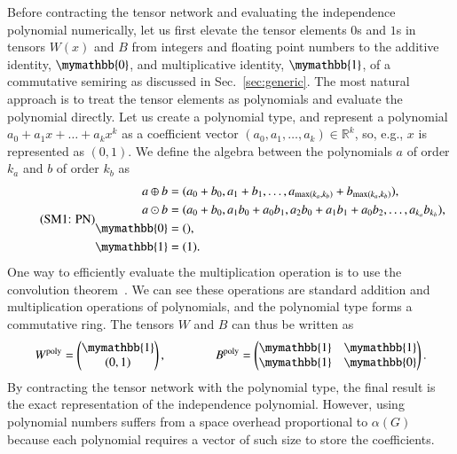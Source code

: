 \documentclass[onefignum, onetabnum]{siamart190516}
\newcommand{\eqname}[1]{\stepcounter{equation}\tag{\theequation : #1}}
\newcommand{\<}{\langle}
\renewcommand{\>}{\rangle}
\begin{document}
Before contracting the tensor network and evaluating the independence polynomial numerically, let us first elevate the tensor elements $0$s and $1$s in tensors $W(x)$ and $B$ from integers and floating point numbers to the additive identity,
$\mymathbb{0}$, and multiplicative identity, $\mymathbb{1}$, of a commutative semiring as discussed in Sec.~\ref{sec:generic}.
The most natural approach is to treat the tensor elements as polynomials and evaluate the polynomial directly.
Let us create a polynomial type, and represent a polynomial $a_0 + a_1 x + \ldots + a_k x^k$ as a coefficient vector $(a_0, a_1, \ldots, a_k) \in \mathbb{R}^k$, so, e.g., $x$ is represented as $(0, 1)$.
We define the algebra between the polynomials $a$ of order $k_a$ and $b$ of order $k_b$ as
\begin{equation}
    \eqname{PN}
    \begin{split}
    a \oplus b &= (a_0 + b_0, a_1 + b_1, \ldots, a_{\max(k_a, k_b)} + b_{\max(k_a, k_b)}),\\
    a \odot b &= (a_0 + b_0, a_1b_0 + a_0b_1, a_{2}b_{0} + a_{1}b_{1} + a_{0}b_{2},  \ldots, a_{k_a} b_{k_b}),\\
    \mymathbb{0} &= (),  \\
    \mymathbb{1} &= (1).\label{eq:polynomial}
    \end{split}
\end{equation}
One way to efficiently evaluate the multiplication operation is to use the convolution theorem~\cite{Schonhage1971}.
We can see these operations are standard addition and multiplication operations of polynomials, and the polynomial type forms a commutative ring. The tensors $W$ and $B$ can thus be written as 
\begin{equation}
    W^{\rm poly} = \left(\begin{matrix}
        \mymathbb{1} \\
        (0,1)
    \end{matrix}\right),   
    \qquad \qquad
        B^{\rm poly} = \left(\begin{matrix}
        \mymathbb{1}  & \mymathbb{1} \\
        \mymathbb{1} & \mymathbb{0}
    \end{matrix}\right).
\end{equation}
By contracting the tensor network with the polynomial type, the final result is the exact representation of the independence polynomial.
However, using polynomial numbers suffers from a space overhead proportional to $\alpha(G)$ because each polynomial requires a vector of such size to store the coefficients. 
\end{document}
